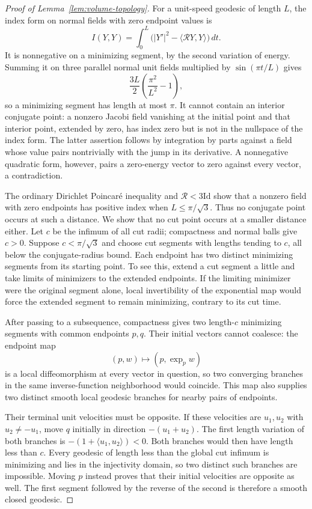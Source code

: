\begin{proof}[Proof of Lemma~\ref{lem:volume-topology}]
For a unit-speed geodesic of length $L$, the index form on normal fields
with zero endpoint values is
\[
 I(Y,Y)=\int_0^L\bigl(|Y'|^2-\langle\mathcal RY,Y\rangle\bigr)\,dt.
\]
It is nonnegative on a minimizing segment, by the second variation of
energy.  Summing it on three parallel normal unit fields multiplied by
$\sin(\pi t/L)$ gives
\[
 \frac{3L}{2}\left(\frac{\pi^2}{L^2}-1\right),
\]
so a minimizing segment has length at most $\pi$.
It cannot contain an interior conjugate point: a nonzero Jacobi field
vanishing at the initial point and that interior point, extended by
zero, has index zero but is not in the nullspace of the index form.
The latter assertion follows by integration by parts against a field
whose value pairs nontrivially with the jump in its derivative.
A nonnegative quadratic form, however, pairs a zero-energy vector to
zero against every vector, a contradiction.

The ordinary Dirichlet Poincar\'e inequality and $\mathcal R<3\mathrm{Id}$
show that a nonzero field with zero endpoints has positive index when
$L\le\pi/\sqrt3$.  Thus no conjugate point occurs at such a distance.
We show that no cut point occurs at a smaller distance either.
Let $c$ be the infimum of all cut radii; compactness and normal balls give
$c>0$.  Suppose $c<\pi/\sqrt3$ and choose cut segments with lengths tending
to $c$, all below the conjugate-radius bound.  Each endpoint has two
distinct minimizing segments from its starting point.  To see this,
extend a cut segment a little and take limits of minimizers to the
extended endpoints.  If the limiting minimizer were the original
segment alone, local invertibility of the exponential map would force
the extended segment to remain minimizing, contrary to its cut time.

After passing to a subsequence, compactness gives two length-$c$
minimizing segments with common endpoints $p,q$.  Their initial vectors
cannot coalesce: the endpoint map
\[
 (p,w)\longmapsto(p,\exp_p w)
\]
is a local diffeomorphism at every vector in question, so two converging
branches in the same inverse-function neighborhood would coincide.
This map also supplies two distinct smooth local geodesic branches for
nearby pairs of endpoints.

Their terminal unit velocities must be opposite.  If these velocities
are $u_1,u_2$ with $u_2\ne-u_1$, move $q$ initially in direction
$-(u_1+u_2)$.  The first length variation of both branches is
$-(1+\langle u_1,u_2\rangle)<0$.  Both branches would then have length
less than $c$.  Every geodesic of length less than the global cut infimum
is minimizing and lies in the injectivity domain, so two distinct such
branches are impossible.  Moving $p$ instead proves that their initial
velocities are opposite as well.  The first segment followed by the
reverse of the second is therefore a smooth closed geodesic.


\end{proof}
